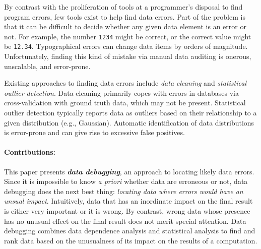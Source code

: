


By contrast with the proliferation of tools at a programmer's disposal
to find program errors, few tools exist to help find data errors. Part
of the problem is that it can be difficult to decide whether any given
data element is an error or not. For example, the number \texttt{1234}
might be correct, or the correct value might
be \texttt{12.34}. Typographical errors can change data items by
orders of magnitude. Unfortunately, finding this kind of mistake via
manual data auditing is onerous, unscalable, and error-prone.




Existing approaches to finding data errors include
\emph{data cleaning} and  \emph{statistical outlier detection}.
Data cleaning primarily copes with errors in databases via
cross-validation with ground truth data, which may not be
present. Statistical outlier detection typically reports data as
outliers based on their relationship to a given distribution (e.g.,
Gaussian).  Automatic identification of data distributions is
error-prone and can give rise to excessive false positives.



\paragraph{Contributions:}
This paper presents \emph{\bf data debugging}, an approach to locating
likely data errors. Since it is impossible to know \emph{a priori}
whether data are erroneous or not, data debugging does the next best
thing: \emph{locating data where errors would have an unsual
impact}. Intuitively, data that has an inordinate impact on the final
result is either very important or it is wrong. By contrast, wrong
data whose presence has no unusual effect on the final result does not
merit special attention.  Data debugging combines data dependence
analysis and statistical analysis to find and rank data based on the unusualness of its
impact on the results of a computation.

